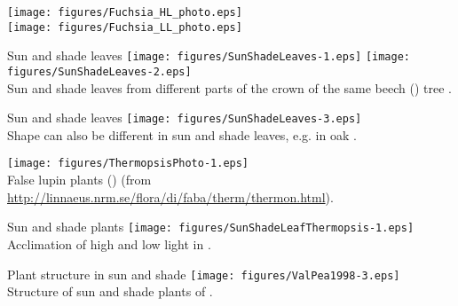 \documentclass[10pt]{beamer}
\begin{document}
\begin{frame}{}
    \centering
    \texttt{[image: figures/Fuchsia\_HL\_photo.eps]}\\
    \texttt{[image: figures/Fuchsia\_LL\_photo.eps]}
\end{frame}

\begin{frame}{Sun and shade leaves}
    \texttt{[image: figures/SunShadeLeaves-1.eps]}
    \texttt{[image: figures/SunShadeLeaves-2.eps]}\\
    {\footnotesize Sun and shade leaves from different parts
    of the crown of the same beech () tree
    \autocite[from][]{Lichtenthaler1985}.}
\end{frame}

\begin{frame}{Sun and shade leaves}
    \centering
   \texttt{[image: figures/SunShadeLeaves-3.eps]}\\
   {\footnotesize Shape can also be different in sun and shade leaves, e.g. in oak \autocite[from][]{Purves1995}.}
\end{frame}


\begin{frame}{}
    \centering
    \texttt{[image: figures/ThermopsisPhoto-1.eps]}\\
    {\footnotesize False lupin plants ()}
    {\tiny (from \url{http://linnaeus.nrm.se/flora/di/faba/therm/thermon.html}).}
\end{frame}

\begin{frame}{Sun and shade plants}
    \centering
    \texttt{[image: figures/SunShadeLeafThermopsis-1.eps]}\\
    {\footnotesize Acclimation of high and low light in  \autocite[from][]{TaiZei2002}.}
\end{frame}

\begin{frame}{Plant structure in sun and shade}
    \centering
    \texttt{[image: figures/ValPea1998-3.eps]}\\
    {\footnotesize Structure of sun and shade plants of 
    \autocite[from][]{ValPea1998}.}
\end{frame}
\end{document}
